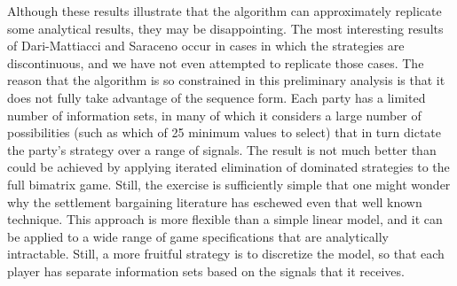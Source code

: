 \documentclass{article}
\begin{document}
Although these results illustrate that the algorithm can approximately replicate some analytical results, they may be disappointing. The most interesting results of Dari-Mattiacci and Saraceno occur in cases in which the strategies are discontinuous, and we have not even attempted to replicate those cases. The reason that the algorithm is so constrained in this preliminary analysis is that it does not fully take advantage of the sequence form. Each party has a limited number of information sets, in many of which it considers a large number of possibilities (such as which of 25 minimum values to select) that in turn dictate the party's strategy over a range of signals. The result is not much better than could be achieved by applying iterated elimination of dominated strategies to the full bimatrix game. Still, the exercise is sufficiently simple that one might wonder why the settlement bargaining literature has eschewed even that well known technique. This approach is more flexible than a simple linear model, and it can be applied to a wide range of game specifications that are analytically intractable. Still, a more fruitful strategy is to discretize the model, so that each player has separate information sets based on the signals that it receives.

\printbibliography
\end{document}
